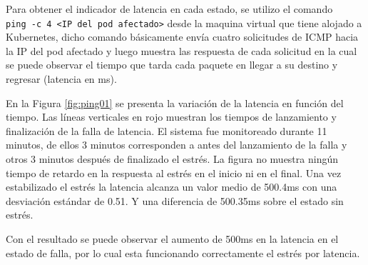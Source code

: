 \par Para obtener el indicador de latencia en cada estado, se utilizo el comando \\ \verb|ping -c 4 <IP del pod afectado>| desde la maquina virtual que tiene alojado a Kubernetes, dicho comando básicamente envía cuatro solicitudes de ICMP hacia la IP del pod afectado y luego muestra las respuesta de cada solicitud en la cual se puede observar el tiempo que tarda cada paquete en llegar a su destino y regresar (latencia en ms).\\


\par En la Figura \ref{fig:ping01} se presenta la variación de la latencia en función del tiempo. Las líneas verticales en rojo muestran los tiempos de lanzamiento y finalización de la falla de latencia. El sistema fue monitoreado durante 11 minutos, de ellos 3 minutos corresponden a antes del lanzamiento de la falla y otros 3 minutos después de finalizado el estrés. La figura no muestra ningún tiempo de retardo en la respuesta al estrés en el inicio ni en el final. Una vez estabilizado el estrés la latencia alcanza un valor medio de 500.4ms con una desviación estándar de 0.51. Y una diferencia de 500.35ms sobre el estado sin estrés.\\

\par Con el resultado se puede observar el aumento de 500ms en la latencia en el estado de falla, por lo cual esta funcionando correctamente el estrés por latencia.\\



